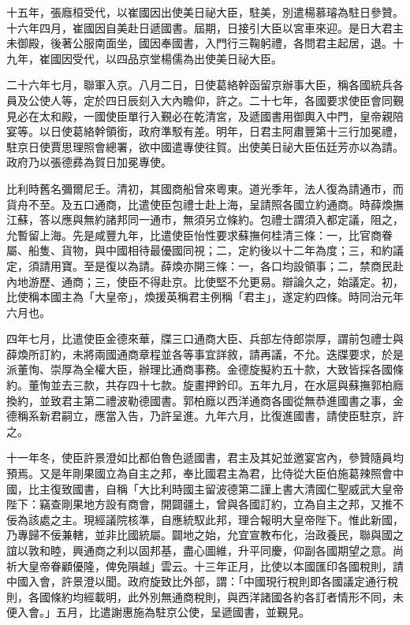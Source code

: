 \begin{pinyinscope}
十五年，張廕桓受代，以崔國因出使美日祕大臣，駐美，別遣楊慕璿為駐日參贊。十六年四月，崔國因自美赴日遞國書。屆期，日接引大臣以宮車來迎。是日大君主未御殿，後著公服南面坐，國因奉國書，入門行三鞠躬禮，各問君主起居，退。十九年，崔國因受代，以四品京堂楊儒為出使美日祕大臣。

二十六年七月，聯軍入京。八月二日，日使葛絡幹函留京辦事大臣，稱各國統兵各員及公使人等，定於四日辰刻入大內瞻仰，許之。二十七年，各國要求使臣會同覲見必在太和殿，一國使臣單行入覲必在乾清宮，及遞國書用御輿入中門，皇帝親陪宴等。以日使葛絡幹領銜，政府準駁有差。明年，日君主阿肅豐第十三行加冕禮，駐京日使賈思理照會總署，欲中國遣專使往賀。出使美日祕大臣伍廷芳亦以為請。政府乃以張德彞為賀日加冕專使。

比利時舊名彌爾尼壬。清初，其國商船曾來粵東。道光季年，法人復為請通市，而貨舟不至。及五口通商，比遣使臣包禮士赴上海，呈請照各國立約通商。時薛煥撫江蘇，答以應與無約諸邦同一通市，無須另立條約。包禮士謂須入都定議，阻之，允暫留上海。先是咸豐九年，比遣使臣怡性要求蘇撫何桂清三條：一，比官商眷屬、船隻、貨物，與中國相待最優國同視；二，定約後以十二年為度；三，和約議定，須請用寶。至是復以為請。薛煥亦開三條：一，各口均設領事；二，禁商民赴內地游歷、通商；三，使臣不得赴京。比使堅不允更易。辯論久之，始議定。初，比使稱本國主為「大皇帝」，煥援英稱君主例稱「君主」，遂定約四條。時同治元年六月也。

四年七月，比遣使臣金德來華，牒三口通商大臣、兵部左侍郎崇厚，謂前包禮士與薛煥所訂約，未將兩國通商章程並各等事宜詳敘，請再議，不允。迭牒要求，於是派董恂、崇厚為全權大臣，辦理比通商事務。金德旋擬約五十款，大致皆採各國條約。董恂並去三款，共存四十七款。旋畫押鈐印。五年九月，在水扈與蘇撫郭柏廕換約，並致君主第二禮波勒德國書。郭柏廕以西洋通商各國從無恭進國書之事，金德稱系新君嗣立，應當入告，乃許呈進。九年六月，比復進國書，請使臣駐京，許之。

十一年冬，使臣許景澄如比都伯魯色遞國書，君主及其妃並邀宴宮內，參贊隨員均預焉。又是年剛果國立為自主之邦，奉比國君主為君，比侍從大臣伯施葛辣照會中國，比主復致國書，自稱「大比利時國主留波德第二謹上書大清國仁聖威武大皇帝陛下：竊查剛果地方設有商會，開闢疆土，曾與各國訂約，立為自主之邦，又推不佞為該處之主。現經議院核準，自應統馭此邦，理合報明大皇帝陛下。惟此新國，乃專歸不佞兼轄，並非比國統屬。闢地之始，允宜宣教布化，治政養民，聯與國之誼以敦和睦，興通商之利以固邦基，盡心圖維，升平同慶，仰副各國期望之意。尚祈大皇帝眷顧優隆，俾免隕越」雲云。十三年正月，比使以本國匯印各國稅則，請中國入會，許景澄以聞。政府旋致比外部，謂：「中國現行稅則即各國議定通行稅則，各國條約均經載明，此外別無通商稅則，與西洋諸國各約各訂者情形不同，未便入會。」五月，比遣謝惠施為駐京公使，呈遞國書，並覲見。


\end{pinyinscope}
